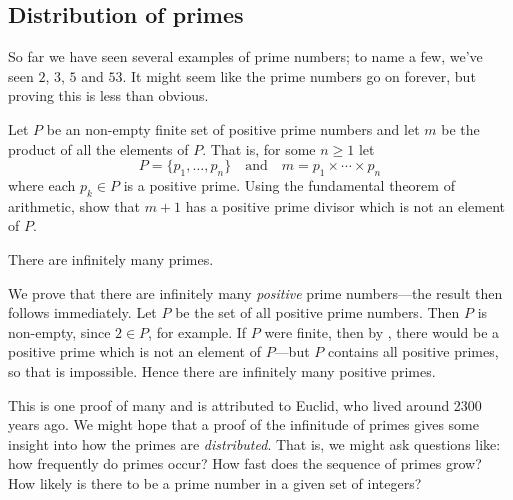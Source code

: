 \subsection*{Distribution of primes}

So far we have seen several examples of prime numbers; to name a few, we've seen $2$, $3$, $5$ and $53$. It might seem like the prime numbers go on forever, but proving this is less than obvious.

\begin{exercise}
\label{exConstructPrimeNotInList}
Let $P$ be an non-empty finite set of positive prime numbers and let $m$ be the product of all the elements of $P$. That is, for some $n \ge 1$ let
\[ P = \{ p_1, \dots, p_n \} \quad \text{and} \quad m = p_1 \times \cdots \times p_n \]
where each $p_k \in P$ is a positive prime. Using the fundamental theorem of arithmetic, show that $m+1$ has a positive prime divisor which is not an element of $P$.
\end{exercise}

\begin{theorem}
There are infinitely many primes.
\end{theorem}
\begin{cproof}
We prove that there are infinitely many \textit{positive} prime numbers---the result then follows immediately. Let $P$ be the set of all positive prime numbers. Then $P$ is non-empty, since $2 \in P$, for example. If $P$ were finite, then by , there would be a positive prime which is not an element of $P$---but $P$ contains all positive primes, so that is impossible. Hence there are infinitely many positive primes.
\end{cproof}

This is one proof of many and is attributed to Euclid, who lived around 2300 years ago. We might hope that a proof of the infinitude of primes gives some insight into how the primes are \textit{distributed}. That is, we might ask questions like: how frequently do primes occur? How fast does the sequence of primes grow? How likely is there to be a prime number in a given set of integers?

